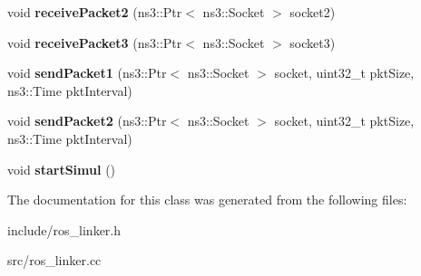 \begin{DoxyCompactItemize}
\item 
\mbox{\label{classrnl_1_1Interface_a6c8bc3fcb375f183d6b0f704dbbbefa9}} 
void {\bfseries receive\+Packet2} (ns3\+::\+Ptr$<$ ns3\+::\+Socket $>$ socket2)
\item 
\mbox{\label{classrnl_1_1Interface_ad494cf4f32d6b1bee7148c0ffb8c5e9e}} 
void {\bfseries receive\+Packet3} (ns3\+::\+Ptr$<$ ns3\+::\+Socket $>$ socket3)
\item 
\mbox{\label{classrnl_1_1Interface_a54c3cd53ef405559a32a96c574cd807e}} 
void {\bfseries send\+Packet1} (ns3\+::\+Ptr$<$ ns3\+::\+Socket $>$ socket, uint32\+\_\+t pkt\+Size, ns3\+::\+Time pkt\+Interval)
\item 
\mbox{\label{classrnl_1_1Interface_ad4676900ea2586b0dd305fb3fd468eb6}} 
void {\bfseries send\+Packet2} (ns3\+::\+Ptr$<$ ns3\+::\+Socket $>$ socket, uint32\+\_\+t pkt\+Size, ns3\+::\+Time pkt\+Interval)
\item 
\mbox{\label{classrnl_1_1Interface_a0d26dbf44a82958c9914a19521b1cb9b}} 
void {\bfseries start\+Simul} ()
\end{DoxyCompactItemize}


The documentation for this class was generated from the following files\+:\begin{DoxyCompactItemize}
\item 
include/ros\+\_\+linker.\+h\item 
src/ros\+\_\+linker.\+cc\end{DoxyCompactItemize}
